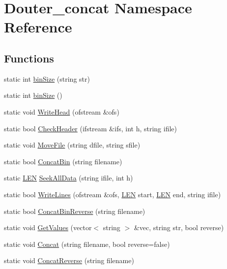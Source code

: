 \hypertarget{namespace_douter__concat}{\section{Douter\+\_\+concat Namespace Reference}
\label{namespace_douter__concat}
}
\subsection*{Functions}
\begin{DoxyCompactItemize}
\item 
static int \hyperlink{namespace_douter__concat_ad5a88da78fc32f038112942cc050229a}{bin\+Size} (string str)
\item 
static int \hyperlink{namespace_douter__concat_a9285724679e63cb19699979337517a81}{bin\+Size} ()
\item 
static void \hyperlink{namespace_douter__concat_a4d11def509a5faec6eee9dc701bf7162}{Write\+Head} (ofstream \&ofs)
\item 
static bool \hyperlink{namespace_douter__concat_a8193758a199f8c1b2dbaab322243d939}{Check\+Header} (ifstream \&ifs, int h, string ifile)
\item 
static void \hyperlink{namespace_douter__concat_a489b9b4145e9325aef23c587c29e939d}{Move\+File} (string dfile, string sfile)
\item 
static bool \hyperlink{namespace_douter__concat_a893fb2379796ffd3bb05818f0ef9ebf6}{Concat\+Bin} (string filename)
\item 
static \hyperlink{energy__const_8hh_a05b49c662c073f89e86804f7856622a0}{L\+E\+N} \hyperlink{namespace_douter__concat_a813d0a9403cf1fbf7d90b9a92cf9987f}{Seek\+All\+Data} (string ifile, int h)
\item 
static bool \hyperlink{namespace_douter__concat_acbcc8dc878123eaa210fe5c79c9fc13a}{Write\+Lines} (ofstream \&ofs, \hyperlink{energy__const_8hh_a05b49c662c073f89e86804f7856622a0}{L\+E\+N} start, \hyperlink{energy__const_8hh_a05b49c662c073f89e86804f7856622a0}{L\+E\+N} end, string ifile)
\item 
static bool \hyperlink{namespace_douter__concat_adcc0d9bde56ec5d6d73bd33f200b3f99}{Concat\+Bin\+Reverse} (string filename)
\item 
static void \hyperlink{namespace_douter__concat_ab7c6a14da8d315c92d6b73d7bbb42eab}{Get\+Values} (vector$<$ string $>$ \&vec, string str, bool reverse)
\item 
static void \hyperlink{namespace_douter__concat_a263bd0f94dd48039d12ca670533b5709}{Concat} (string filename, bool reverse=false)
\item 
static void \hyperlink{namespace_douter__concat_a9d79d3e99a422f02d168f74c29522af2}{Concat\+Reverse} (string filename)
\end{DoxyCompactItemize}


